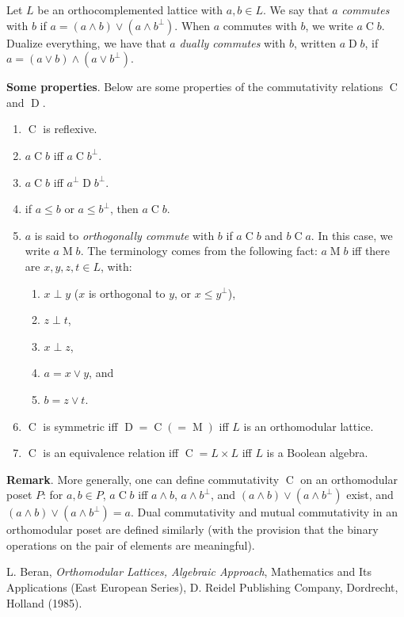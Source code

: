 \documentclass[12pt]{article}
\newcommand{\com}{\operatorname{C}}
\newcommand{\dcom}{\operatorname{D}}
\newcommand{\mcom}{\operatorname{M}}
\begin{document}
Let $L$ be an orthocomplemented lattice with $a,b\in L$.  We say that $a$ \emph{commutes} with $b$ if $a=(a\wedge b)\vee (a\wedge b^{\perp})$.  When $a$ commutes with $b$, we write $a\com b$.  Dualize everything, we have that $a$ \emph{dually commutes} with $b$, written $a\dcom b$, if $a=(a\vee b)\wedge (a\vee b^{\perp})$.

\textbf{Some properties}.  Below are some properties of the commutativity relations $\com$ and $\dcom$.
\begin{enumerate}
\item $\com$ is reflexive.
\item $a \com b$ iff $a \com b^{\perp}$.
\item $a \com b$ iff $a^{\perp} \dcom b^{\perp}$.
\item if $a\le b$ or $a\le b^{\perp}$, then $a\com b$.
\item $a$ is said to \emph{orthogonally commute} with $b$ if $a \com b$ and $b\com a$.  In this case, we write $a \mcom b$.  The terminology comes from the following fact: $a \mcom b$ iff there are $x,y,z,t\in L$, with:
\begin{enumerate}
\item $x\perp y$ ($x$ is orthogonal to $y$, or $x\le y^{\perp}$), 
\item $z\perp t$, 
\item $x\perp z$,
\item $a=x\vee y$, and 
\item $b=z\vee t$.
\end{enumerate}
\item $\com$ is symmetric iff $\dcom=\com (=\mcom)$ iff $L$ is an orthomodular lattice.
\item $\com$ is an equivalence relation iff $\com=L\times L$ iff $L$ is a Boolean algebra.
\end{enumerate}

\textbf{Remark}.  More generally, one can define commutativity $\com$ on an orthomodular poset $P$: for $a,b\in P$, $a \com b$ iff $a\wedge b$, $a\wedge b^{\perp}$, and $(a\wedge b)\vee (a\wedge b^{\perp})$ exist, and $(a\wedge b)\vee (a\wedge b^{\perp})=a$.  Dual commutativity and mutual commutativity in an orthomodular poset are defined similarly (with the provision that the binary operations on the pair of elements are meaningful).

\begin{thebibliography}{8}
 L. Beran, {\em Orthomodular Lattices, Algebraic Approach}, Mathematics and Its Applications (East European Series), D. Reidel Publishing Company, Dordrecht, Holland (1985).
\end{thebibliography}
\end{document}
